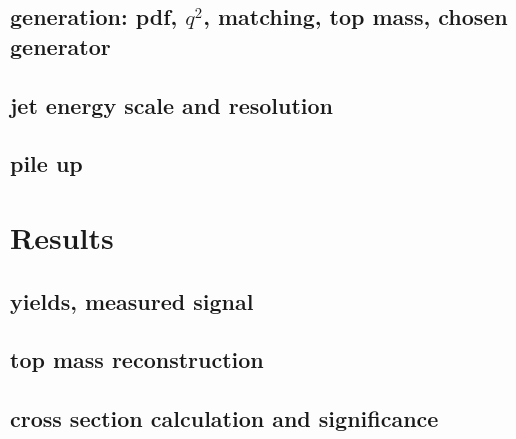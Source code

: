 \documentclass[12pt,chapterheads,oneside]{ucsd}
\begin{document}
	\section{generation: pdf, $q^2$, matching, top mass, chosen generator}
	\section{jet energy scale and resolution}
	\section{pile up}

\chapter{Results}
	\section{yields, measured signal}
	\section{top mass reconstruction}
	\section{cross section calculation and significance}
   






\appendix
\end{document}
